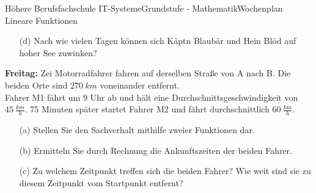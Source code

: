 \documentclass[oneside,openany,headings=optiontotoc,11pt,numbers=noenddot]{scrreprt}
\begin{document}
\begin{worksheet}{Höhere Berufsfachschule IT-Systeme}{Grundstufe - Mathematik}{Wochenplan Lineare Funktionen}
\begin{framed}
\begin{itemize}
				\item[(d)] Nach wie vielen Tagen können  sich Käpt\grq{}n Blaubär und Hein Blöd auf hoher See zuwinken?
			\end{itemize}
		\end{framed}
		\begin{framed}
			\noindent
			\textbf{Freitag:} Zei Motorradfahrer fahren auf derselben Straße von A nach B. Die beiden Orte sind \(270\ km\) voneinander entfernt.\\
			Fahrer M1 fährt um 9 Uhr ab und hält eine Durchschnittsgeschwindigkeit von \(45\ \frac{km}{h}\). 75 Minuten später startet Fahrer M2 und fährt durchschnittlich \(60\ \frac{km}{h}\).
			\begin{itemize}
				\item[(a)] Stellen Sie den Sachverhalt mithilfe zweier Funktionen dar.
				\item[(b)] Ermitteln Sie durch Rechnung die Ankunftszeiten der beiden Fahrer.
				\item[(c)] Zu welchem Zeitpunkt treffen sich die beiden Fahrer? Wie weit sind sie zu diesem Zeitpunkt vom Startpunkt entfernt?
			\end{itemize}
		\end{framed}
	\end{worksheet}
\end{document}
